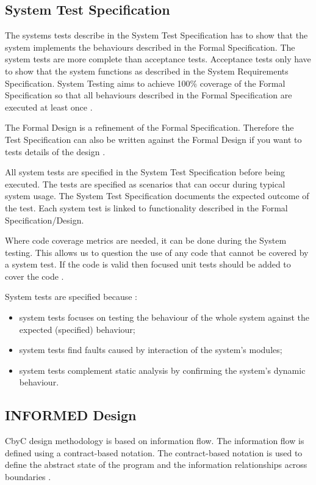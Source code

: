 \subsection{System Test Specification}

The systems tests describe in the System Test Specification has to show that the system implements the 
behaviours described in the Formal Specification. The system tests are more complete than 
acceptance tests. Acceptance tests only have to show that the system functions as described in the 
System Requirements Specification. System Testing aims to achieve 100\% coverage of the Formal 
Specification so that all behaviours described in the Formal Specification are executed at least once \parencite{Tokeneer}.

The Formal Design is a refinement of the Formal Specification. Therefore the Test
Specification can also be written against the Formal Design if you want to tests 
details of the design \parencite{Tokeneer}.

All system tests are specified in the System Test Specification before being executed.
The tests are specified as scenarios that can occur during typical system usage. 
The System Test Specification documents the expected outcome of the test. 
Each system test is linked to functionality described in the Formal Specification/Design\parencite{Tokeneer}.

Where code coverage metrics are needed, it can be done during the System testing. 
This allows us to question the use of any code that cannot be covered
by a system test. If the code is valid then focused unit tests should be added to
cover the code \parencite{Tokeneer}.

System tests are specified because \parencite{Tokeneer}:
\begin{itemize}
	\item system tests focuses on testing the behaviour of the whole system against
		the expected (specified) behaviour;
	\item system tests find faults caused by interaction of the system's modules;
	\item system tests complement static analysis by confirming the system's dynamic behaviour.
\end{itemize}

\subsection{INFORMED Design}
CbyC design methodology is based on information flow. The information flow is 
defined using a contract-based notation. The contract-based notation is used to
define the abstract state of the program and the information relationships across
boundaries \parencite{CbyCMan}.


